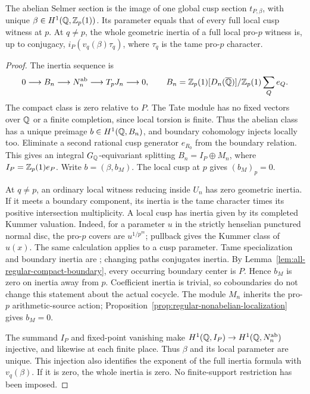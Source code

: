 \begin{lemma}
\label{lem:all-regular-abelian-packet}
The abelian Selmer section is the image of one global cusp section
$t_{P,\beta}$, with unique $\beta\in H^1(\mathbb Q,\mathbb Z_p(1))$. Its parameter
equals that of every full local cusp witness at $p$.
At $q\ne p$, the whole geometric inertia of a full local pro-$p$
witness is, up to conjugacy, $i_P(v_q(\beta)\tau_q)$, where
$\tau_q$ is the tame pro-$p$ character.
\end{lemma}
\begin{proof}
The inertia sequence is
\[
0\longrightarrow B_n\longrightarrow N_n^{\mathrm{ab}}
 \longrightarrow T_pJ_n\longrightarrow0,\qquad
B_n=\mathbb Z_p(1)[D_n(\overline{\mathbb Q})]/\mathbb Z_p(1)\sum_Qe_Q.
\]
The compact class is zero relative to $P$.
The Tate module has no fixed vectors over $\mathbb Q$ or a finite
completion, since local torsion is finite. Thus the abelian class
has a unique preimage $b\in H^1(\mathbb Q,B_n)$, and boundary cohomology
injects locally too. Eliminate a second rational cusp generator
$e_{R_0}$ from the boundary relation. This gives an integral
$G_\mathbb Q$-equivariant splitting $B_n=I_P\oplus M_n$, where
$I_P=\mathbb Z_p(1)e_P$. Write $b=(\beta,b_M)$. The local cusp at $p$
gives $(b_M)_p=0$.

At $q\ne p$, an ordinary local witness reducing inside $U_n$
has zero geometric inertia. If it meets a boundary component,
its inertia is the tame character times its positive intersection
multiplicity. A local cusp has inertia given by its completed
Kummer valuation. Indeed, for a parameter $u$ in the strictly
henselian punctured normal disc, the pro-$p$ covers are
$u^{1/p^m}$; pullback gives the Kummer class of $u(x)$.
The same calculation applies to a cusp parameter.
Tame specialization and boundary inertia are
\citet[Expos\'e~XIII, Corollary~2.9, \S2.10 and Lemma~2.11,
pp.~288--290]{SGA1}; changing paths conjugates inertia.
By Lemma~\ref{lem:all-regular-compact-boundary}, every occurring
boundary center is $P$. Hence $b_M$ is zero on inertia away
from $p$. Coefficient inertia is trivial, so coboundaries do
not change this statement about the actual cocycle.
The module $M_n$ inherits the pro-$p$ arithmetic-source action;
Proposition~\ref{prop:regular-nonabelian-localization} gives $b_M=0$.

The summand $I_P$ and fixed-point vanishing make
$H^1(\mathbb Q,I_P)\to H^1(\mathbb Q,N_n^{\mathrm{ab}})$ injective, and likewise
at each finite place. Thus $\beta$ and its local parameter are
unique. This injection also identifies the exponent of the full
inertia formula with $v_q(\beta)$. If it is zero, the whole
inertia is zero. No finite-support restriction has been imposed.
\end{proof}

